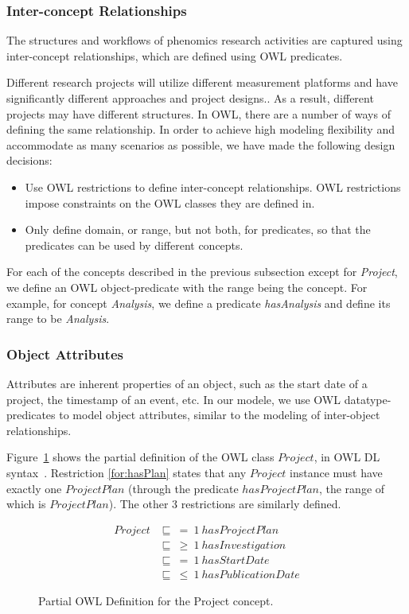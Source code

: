 \documentclass{llncs}
\begin{document}
\subsubsection{Inter-concept Relationships}
The structures and workflows of phenomics research activities are
captured using inter-concept relationships, which are defined using
OWL predicates.

Different research projects will utilize different measurement
platforms and have significantly different approaches and project
designs.. As a result, different projects may have different
structures. In OWL, there are a number of ways of defining the same
relationship. In order to achieve high modeling flexibility and
accommodate as many scenarios as possible, we have made the
following design decisions:

\begin{itemize}
\item Use OWL restrictions to define inter-concept relationships.
OWL restrictions impose constraints on the OWL classes they are
defined in.

\item Only define domain, or range, but not both, for predicates, so that the
predicates can be used by different concepts.
\end{itemize}

For each of the concepts described in the previous subsection except
for \emph{Project}, we define an OWL object-predicate with the range
being the concept. For example, for concept \emph{Analysis}, we
define a predicate \emph{hasAnalysis} and define its range to be
\emph{Analysis}.

\subsubsection{Object Attributes}
Attributes are inherent properties of an object, such as the start
date of a project, the timestamp of an event, etc. In our modele, we
use OWL datatype-predicates to model object attributes, similar to
the modeling of inter-object relationships.

Figure~\ref{fig:project_owl} shows the partial definition of the OWL
class $Project$, in OWL DL syntax~\cite{hoph03a}. Restriction
\ref{for:hasPlan} states that any $Project$ instance must have
exactly one $ProjectPlan$ (through the predicate $hasProjectPlan$,
the range of which is $ProjectPlan$). The other 3 restrictions are
similarly defined.

\vspace{-20pt}
\begin{figure}[htb]
\centering
\begin{align}
Project &\sqsubseteq~ =~ 1~ hasProjectPlan\label{for:hasPlan}\\
        &\sqsubseteq~ \geq~ 1~ hasInvestigation\\
        &\sqsubseteq~ =~ 1~ hasStartDate\\
        &\sqsubseteq~ \leq~ 1~ hasPublicationDate
\end{align}
\vspace{-16pt} \caption{Partial OWL Definition for the Project
concept.}\label{fig:project_owl}
\end{figure}
\end{document}
